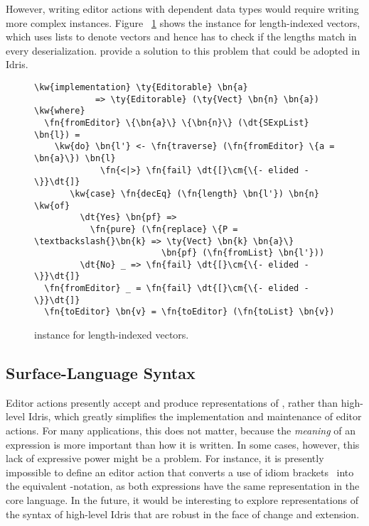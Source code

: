 However, writing editor actions with dependent data types would require writing
more complex \Editorable{} instances.  Figure ~\ref{code:editorable-vect} shows the
\Editorable{} instance for length-indexed vectors, which uses lists to denote
vectors and hence has to check if the lengths match in every deserialization.
\citet{foundations-dep-interop} provide a solution to this problem that could be
adopted in Idris.

\begin{figure}[H]
\begin{Verbatim}
\kw{implementation} \ty{Editorable} \bn{a}
            => \ty{Editorable} (\ty{Vect} \bn{n} \bn{a}) \kw{where}
  \fn{fromEditor} \{\bn{a}\} \{\bn{n}\} (\dt{SExpList} \bn{l}) =
    \kw{do} \bn{l'} <- \fn{traverse} (\fn{fromEditor} \{a = \bn{a}\}) \bn{l}
             \fn{<|>} \fn{fail} \dt{[}\cm{\{- elided -\}}\dt{]}
       \kw{case} \fn{decEq} (\fn{length} \bn{l'}) \bn{n} \kw{of}
         \dt{Yes} \bn{pf} =>
           \fn{pure} (\fn{replace} \{P = \textbackslash{}\bn{k} => \ty{Vect} \bn{k} \bn{a}\}
                         \bn{pf} (\fn{fromList} \bn{l'}))
         \dt{No} _ => \fn{fail} \dt{[}\cm{\{- elided -\}}\dt{]}
  \fn{fromEditor} _ = \fn{fail} \dt{[}\cm{\{- elided -\}}\dt{]}
  \fn{toEditor} \bn{v} = \fn{toEditor} (\fn{toList} \bn{v})
\end{Verbatim}
\caption{\Editorable{} instance for length-indexed vectors.}
\label{code:editorable-vect}
\end{figure}

\subsection{Surface-Language Syntax}

Editor actions presently accept and produce representations of \TT{},
rather than high-level Idris, which greatly simplifies the
implementation and maintenance of editor actions. For many
applications, this does not matter, because the \emph{meaning} of an
expression is more important than how it is written. In some cases,
however, this lack of expressive power might be a problem. For
instance, it is presently impossible to define an editor action that
converts a use of idiom brackets~\citep{Applicative} into the
equivalent -notation, as both expressions have the same
representation in the core language. In the future, it would be
interesting to explore representations of the syntax of high-level
Idris that are robust in the face of change and extension.



